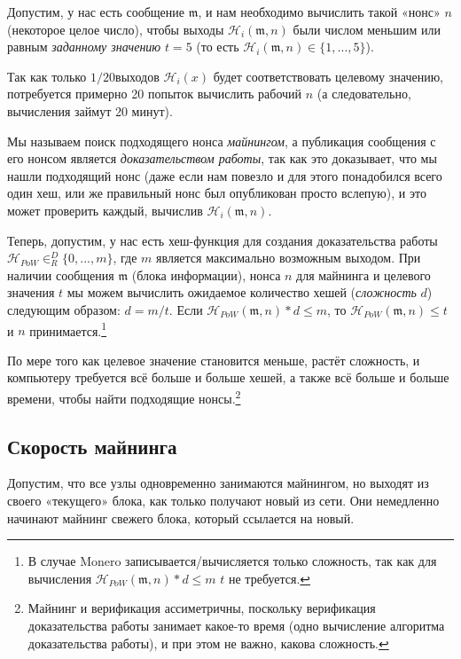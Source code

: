 Допустим, у нас есть сообщение $\mathfrak{m}$, и нам необходимо вычислить такой «нонс» $n$ (некоторое целое число), чтобы выходы $\mathcal{H}_i(\mathfrak{m},n)$ были числом меньшим или равным {\em заданному значению} $t = 5$ (то есть $\mathcal{H}_i(\mathfrak{m},n) \in \{1,...,5\}$). 

Так как только $1/20$\nth выходов $\mathcal{H}_i(x)$ будет соответствовать целевому значению, потребуется примерно 20 попыток вычислить рабочий $n$ (а следовательно, вычисления займут 20 минут).

Мы называем поиск подходящего нонса {\em майнингом}, а публикация сообщения с его нонсом является {\em доказательством работы}, так как это доказывает, что мы нашли подходящий нонс (даже если нам повезло и для этого понадобился всего один хеш, или же правильный нонс был опубликован просто вслепую), и это может проверить каждый, вычислив $\mathcal{H}_i(\mathfrak{m},n)$.

Теперь, допустим, у нас есть хеш-функция для создания доказательства работы $\mathcal{H}_{PoW} \in^D_R \{0,...,m\}$, где $m$ является максимально возможным выходом. При наличии сообщения $\mathfrak{m}$ (блока информации), нонса $n$ для майнинга и целевого значения $t$ мы можем вычислить ожидаемое количество хешей ({\em сложность} $d$) следующим образом: $d = m/t$. Если $\mathcal{H}_{PoW}(\mathfrak{m},n)*d \leq m$, то $\mathcal{H}_{PoW}(\mathfrak{m},n) \leq t$ и $n$ принимается.\footnote{В случае Monero записывается/вычисляется только сложность, так как для вычисления $\mathcal{H}_{PoW}(\mathfrak{m},n)*d \leq m$ $t$ не требуется.}

По мере того как целевое значение становится меньше, растёт сложность, и компьютеру требуется всё больше и больше хешей, а также всё больше и больше времени, чтобы найти подходящие нонсы.\footnote{Майнинг и верификация ассиметричны, поскольку верификация доказательства работы занимает какое-то время (одно вычисление алгоритма доказательства работы), и при этом не важно, какова сложность.}


\subsection{Скорость майнинга}

Допустим, что все узлы одновременно занимаются майнингом, но выходят из своего «теку\-щего» блока, как только получают новый из сети. Они немедленно начинают майнинг свежего блока, который ссылается на новый.

